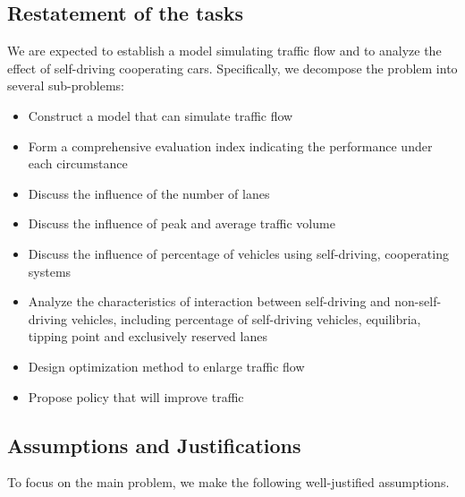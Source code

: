 \documentclass[a4paper]{article}
\begin{document}
	\subsection{Restatement of the tasks}
	We are expected to establish a model simulating traffic flow and to analyze the effect of self-driving cooperating cars. Specifically, we decompose the problem into several sub-problems:
	\begin{itemize}
		\item Construct a model that can simulate traffic flow
		\item Form a comprehensive evaluation index indicating the performance under each circumstance
		\item Discuss the influence of the number of lanes
		\item Discuss the influence of peak and average traffic volume
		\item Discuss the influence of percentage of vehicles using self-driving, cooperating systems
		\item Analyze the characteristics of interaction between self-driving and non-self-driving vehicles, including percentage of self-driving vehicles, equilibria, tipping point and exclusively reserved lanes
		\item Design optimization method to enlarge traffic flow
		\item Propose policy that will improve traffic
	\end{itemize}

	\subsection{Assumptions and Justifications}
    To focus on the main problem, we make the following well-justified assumptions.
\end{document}
